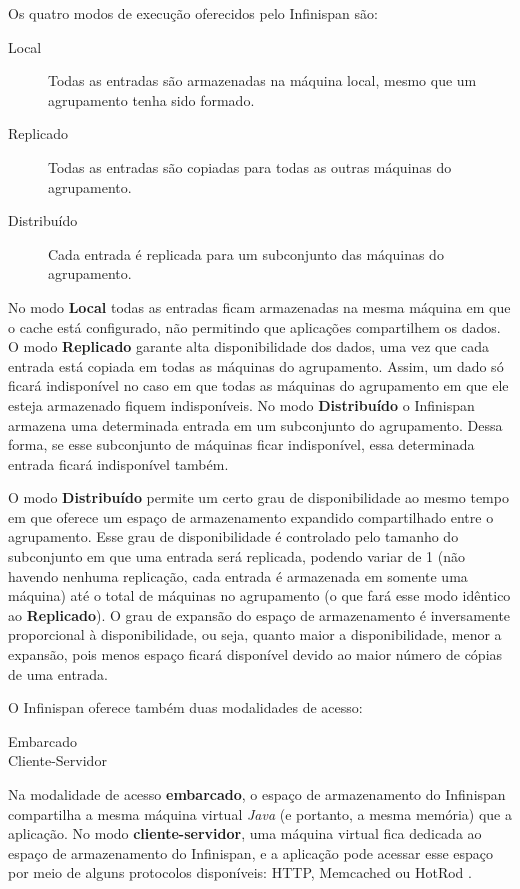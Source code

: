 \documentclass[11pt,twoside,a4paper]{book}
\begin{document}
Os quatro modos de execução oferecidos pelo Infinispan são:

\begin{description}
	\item[Local] Todas as entradas são armazenadas na máquina local, mesmo que um agrupamento tenha sido formado.
	\item[Replicado] Todas as entradas são copiadas para todas as outras máquinas do agrupamento.
	\item[Distribuído] Cada entrada é replicada para um subconjunto das máquinas do agrupamento.
\end{description}

No modo \textbf{Local} todas as entradas ficam armazenadas na mesma máquina em que o cache está configurado, não permitindo que aplicações compartilhem os dados. O modo \textbf{Replicado} garante alta disponibilidade dos dados, uma vez que cada entrada está copiada em todas as máquinas do agrupamento. Assim, um dado só ficará indisponível no caso em que todas as máquinas do agrupamento em que ele esteja armazenado fiquem indisponíveis. No modo \textbf{Distribuído} o Infinispan armazena uma determinada entrada em um subconjunto do agrupamento. Dessa forma, se esse subconjunto de máquinas ficar indisponível, essa determinada entrada ficará indisponível também. 

O modo \textbf{Distribuído} permite um certo grau de disponibilidade ao mesmo tempo em que oferece um espaço de armazenamento expandido compartilhado entre o agrupamento. Esse grau de disponibilidade é controlado pelo tamanho do subconjunto em que uma entrada será replicada, podendo variar de 1 (não havendo nenhuma replicação, cada entrada é armazenada em somente uma máquina) até o total de máquinas no agrupamento (o que fará esse modo idêntico ao \textbf{Replicado}). O grau de expansão do espaço de armazenamento é inversamente proporcional à disponibilidade, ou seja, quanto maior a disponibilidade, menor a expansão, pois menos espaço ficará disponível devido ao maior número de cópias de uma entrada.

O Infinispan oferece também duas modalidades de acesso:

\begin{description}
	\item[Embarcado]
	\item[Cliente-Servidor] 
\end{description}

Na modalidade de acesso \textbf{embarcado}, o espaço de armazenamento do Infinispan compartilha a mesma máquina virtual \emph{Java} (e portanto, a mesma memória) que a aplicação. No modo \textbf{cliente-servidor}, uma máquina virtual fica dedicada ao espaço de armazenamento do Infinispan, e a aplicação pode acessar esse espaço por meio de alguns protocolos disponíveis: HTTP, Memcached ou HotRod \cite{infinispan}.
\end{document}
